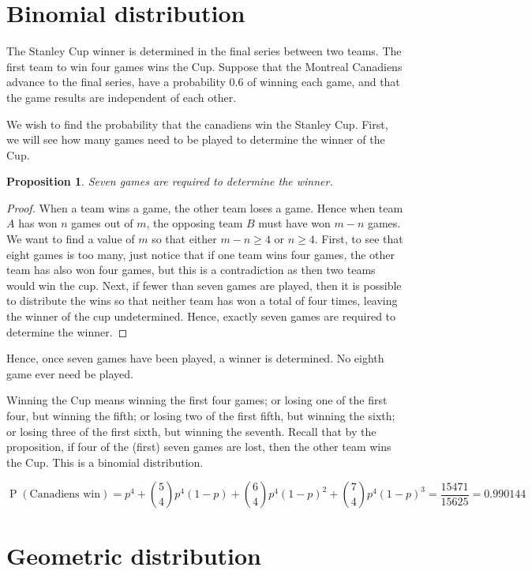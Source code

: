 \documentclass[letterpaper,11pt]{article}
\newtheorem{prop}{Proposition}
\DeclareMathOperator{\Prob}{P}
\renewcommand{\P}[1]{\Prob{\parens{#1}}}
\newcommand{\parens}[1]{\left(#1\right)}
\newcommand{\question}{\section}
\begin{document}
\question{Binomial distribution}

The Stanley Cup winner is determined in the final series between two teams. The
first team to win four games wins the Cup. Suppose that the Montreal Canadiens
advance to the final series, have a probability $0.6$ of winning each game, and
that the game results are independent of each other.

We wish to find the probability that the canadiens win the Stanley Cup. First,
we will see how many games need to be played to determine the winner of the
Cup.

\begin{prop}
    Seven games are required to determine the winner.
\end{prop}

\begin{proof}
    When a team wins a game, the other team loses a game. Hence when team $A$
    has won $n$ games out of $m$, the opposing team $B$ must have won $m - n$
    games. We want to find a value of $m$ so that either $m - n \geq 4$ or
    $n \geq 4$.
    First, to see that eight games is too many, just notice that if one team
    wins four games, the other team has also won four games, but this is a
    contradiction as then two teams would win the cup.
    Next, if fewer than seven games are played, then it is possible to
    distribute the wins so that neither team has won a total of four times,
    leaving the winner of the cup undetermined.
    Hence, exactly seven games are required to determine the winner.
\end{proof}

Hence, once seven games have been played, a winner is determined. No eighth
game ever need be played.

Winning the Cup means winning the first four games; or losing one of the first
four, but winning the fifth; or losing two of the first fifth, but winning the
sixth; or losing three of the first sixth, but winning the seventh. Recall that
by the proposition, if four of the (first) seven games are lost, then the other
team wins the Cup. This is a binomial distribution.

\begin{equation*}
    \P{\text{Canadiens win}}
    = p^4
    + {5 \choose 4} p^4 (1-p)
    + {6 \choose 4} p^4 (1-p)^2
    + {7 \choose 4} p^4 (1-p)^3
    = \frac{15471}{15625}
    = 0.990144
\end{equation*}

\question{Geometric distribution}
\end{document}
